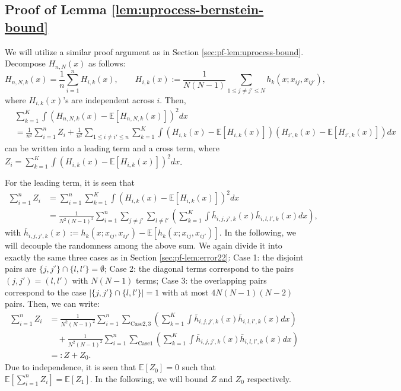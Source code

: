 \documentclass[preprint,11pt]{article}
\newcommand{\mbb}{\mathbb}
\numberwithin{equation}{section}
\begin{document}
\iffalse
\subsection{Proof of Lemma \ref{lem:uprocess-bernstein-bound}}
We will utilize a similar proof argument as in Section \ref{sec:pf-lem:uprocess-bound}. Decompose $H_{n,N}(x)$ as follows: 
\[
 H_{n,N,k}(x)=\frac{1}{n}\sum_{i=1}^n H_{i,k}(x), \qquad        H_{i,k}(x):=\frac{1}{N(N-1)}\sum_{1\le j\neq j'\le N}h_k(x;x_{ij},x_{ij'}), 
\]
where $H_{i,k}(x)$'s are independent across $i$. Then, 
\begin{align}\label{pf-first-decompose}
    &\sum_{k=1}^K\int (H_{n,N,k}(x)-\mbb{E}[H_{n,N,k}(x)])^2dx\\\nonumber
    &=\frac{1}{n^2}\sum_{i=1}^n Z_i+\frac{1}{n^2}\sum_{1\le i\neq i'\le n}\sum_{k=1}^K\int (H_{i,k}(x)-\mbb{E}[H_{i,k}(x)])(H_{i',k}(x)-\mbb{E}[H_{i',k}(x)])dx
\end{align}
can be written into a leading term and a cross term, where $Z_i=\sum_{k=1}^K\int  (H_{i,k}(x)-\mbb{E}[H_{i,k}(x)])^2dx$.

For the leading term, it is seen that 
\begin{align*}
    \sum_{i=1}^n Z_i&=\sum_{i=1}^n\sum_{k=1}^K\int  (H_{i,k}(x)-\mbb{E}[H_{i,k}(x)])^2dx \\
    &=\frac{1}{N^2(N-1)^2}\sum_{i=1}^n\sum_{j\neq j'}\sum_{l\neq l'}\left(\sum_{k=1}^K\int \bar{h}_{i,j,j',k}(x)\bar{h}_{i,l,l',k}(x)dx\right),
\end{align*}
with $\bar{h}_{i,j,j',k}(x):=h_k(x;x_{ij},x_{ij'})-\mbb{E}[h_k(x;x_{ij},x_{ij'})]$. In the following, we will decouple the randomness among the above sum. We again divide it into exactly the same three cases as in Section \ref{sec:pf-lem:error22}: Case 1: the disjoint pairs are $\{j,j'\}\cap \{l,l'\}=\emptyset$; Case 2: the diagonal terms correspond to the pairs $(j,j')=(l,l')$ with $N(N-1)$ terms; Case 3: the overlapping pairs correspond to the case $|\{j,j'\}\cap \{l,l'\}|=1$ with at most $4N(N-1)(N-2)$ pairs. Then, we can write:
\begin{align*}
    \sum_{i=1}^n Z_i &=\frac{1}{N^2(N-1)^2}\sum_{i=1}^n\sum_{\text{Case} 2,3}\left(\sum_{k=1}^K\int \bar{h}_{i,j,j',k}(x)\bar{h}_{i,l,l',k}(x)dx\right)\\
    &\quad+\frac{1}{N^2(N-1)^2}\sum_{i=1}^n\sum_{\text{Case} 1}\left(\sum_{k=1}^K\int \bar{h}_{i,j,j',k}(x)\bar{h}_{i,l,l',k}(x)dx\right)\\
    &=:Z+Z_0.
\end{align*}
Due to independence, it is seen that $\mbb{E}[Z_0]=0$ such that $\mbb{E}\left[\sum_{i=1}^n Z_i\right]=\mbb{E}[Z_1]$. In the following, we will bound $Z$ and $Z_0$ respectively.
\end{document}
